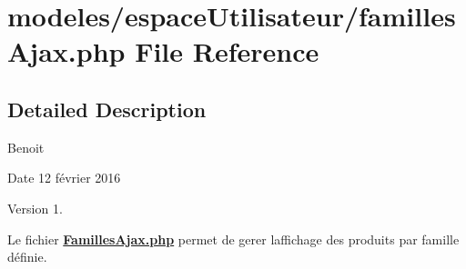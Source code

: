 \hypertarget{familles_ajax_8php}{}\section{modeles/espace\+Utilisateur/familles\+Ajax.php File Reference}
\label{familles_ajax_8php}


\subsection{Detailed Description}
Benoit \begin{DoxyDate}{Date}
12 février 2016 
\end{DoxyDate}
\begin{DoxyVersion}{Version}
1.
\end{DoxyVersion}
Le fichier {\bfseries \hyperlink{familles_ajax_8php}{Familles\+Ajax.\+php}} permet de gerer l\textquotesingle{}affichage des produits par famille définie. 